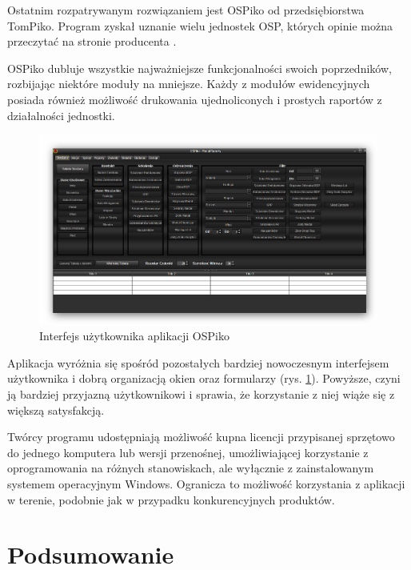 Ostatnim rozpatrywanym rozwiązaniem jest  OSPiko od przedsiębiorstwa TomPiko. Program zyskał uznanie wielu jednostek OSP, których opinie można przeczytać na stronie producenta \cite{OSPiko}.

OSPiko dubluje wszystkie najważniejsze funkcjonalności swoich poprzedników, rozbijając niektóre moduły na mniejsze. Każdy z modułów ewidencyjnych posiada również możliwość drukowania ujednoliconych i prostych raportów z działalności jednostki.

\begin{figure}
    \centering
    \includegraphics[width=\textwidth]{img/chapter2/ospiko.png}
    \caption{Interfejs użytkownika aplikacji OSPiko}
    \label{fig:OSPiko}
\end{figure}

Aplikacja wyróżnia się spośród pozostałych bardziej nowoczesnym interfejsem użytkownika i dobrą organizacją okien oraz formularzy (rys. \ref{fig:OSPiko}). Powyższe, czyni ją bardziej przyjazną użytkownikowi i sprawia, że korzystanie z niej wiąże się z większą satysfakcją.

Twórcy programu udostępniają możliwość kupna licencji przypisanej sprzętowo do jednego komputera lub wersji przenośnej, umożliwiającej korzystanie z oprogramowania na różnych stanowiskach, ale wyłącznie z zainstalowanym systemem operacyjnym Windows. Ogranicza to możliwość korzystania z aplikacji w terenie, podobnie jak w przypadku konkurencyjnych produktów.


\section{Podsumowanie}

